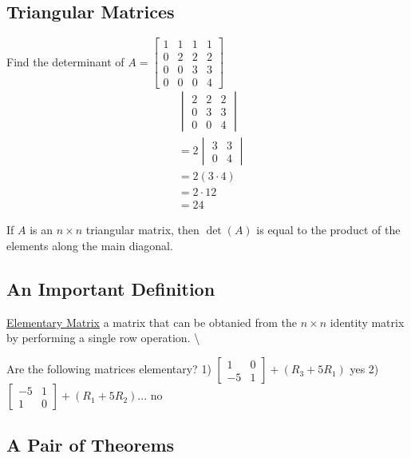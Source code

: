 \documentclass[
  letterpaper,
  DIV=11,
  numbers=noendperiod]{scrartcl}
\begin{document}
\hypertarget{triangular-matrices}{%
\subsection{Triangular Matrices}\label{triangular-matrices}}

Find the determinant of
\(A = \begin{bmatrix}1 & 1 & 1 & 1 \\ 0 & 2 & 2 & 2 \\ 0 & 0 & 3 & 3 \\ 0 & 0 & 0 & 4\end{bmatrix}\)
\begin{align*}
&\begin{vmatrix}2 & 2 & 2 \\ 0 & 3 & 3 \\ 0 & 0 & 4\end{vmatrix} \\
&= 2\begin{vmatrix}3 & 3 \\ 0 & 4\end{vmatrix} \\
&= 2(3\cdot4) \\
&= 2\cdot12 \\
&=24
\end{align*}

If \(A\) is an \(n \times n\) triangular matrix, then \(\det(A)\) is
equal to the product of the elements along the main diagonal.

\hypertarget{an-important-definition}{%
\subsection{An Important Definition}\label{an-important-definition}}

\ul{Elementary Matrix} a matrix that can be obtanied from the
\(n \times n\) identity matrix by performing a single row operation.
\textbackslash{}

Are the following matrices elementary? 1)
\(\begin{bmatrix}1 & 0 \\ -5 & 1\end{bmatrix}+(R_3+5R_1)\) yes 2)
\(\begin{bmatrix}-5 & 1 \\ 1 & 0\end{bmatrix}+(R_1+5R_2)...\) no

\hypertarget{a-pair-of-theorems}{%
\subsection{A Pair of Theorems}\label{a-pair-of-theorems}}
\end{document}
